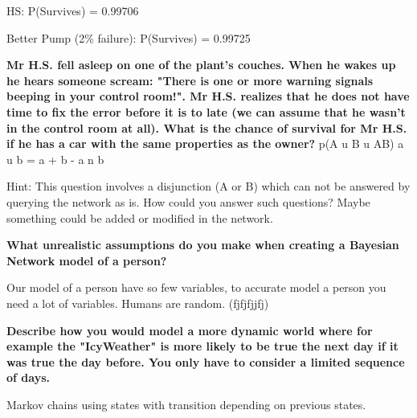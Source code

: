 \documentclass[12pt,a4paper]{article}
\begin{document}
HS:
P(Survives) = 0.99706

Better Pump (2\% failure):
P(Survives) = 0.99725


\textbf{Mr H.S. fell asleep on one of the plant's couches. When he wakes up he hears someone scream: "There is one or more warning signals beeping in your control room!". Mr H.S. realizes that he does not have time to fix the error before it is to late (we can assume that he wasn't in the control room at all). What is the chance of survival for Mr H.S. if he has a car with the same properties as the owner?}
p(A u B u AB)
a u b = a + b - a n b


Hint: This question involves a disjunction (A or B) which can not be answered by querying the network as is. How could you answer such questions? Maybe something could be added or modified in the network.

\textbf{What unrealistic assumptions do you make when creating a Bayesian Network model of a person?}

Our model of a person have so few variables, to accurate model a person you need a lot of variables. Humans are random. (fjfjfjjfj)

\textbf{Describe how you would model a more dynamic world where for example the "IcyWeather" is more likely to be true the next day if it was true the day before. You only have to consider a limited sequence of days.}

Markov chains using states with transition depending on previous states.
\end{document}
